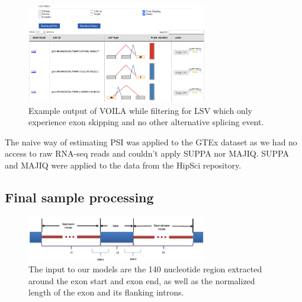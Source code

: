 \begin{figure}
	\centering\includegraphics[width=0.7\textwidth]{../visualizations/voila_example.png} 
	\caption[Four-chamber illustration of the human heart.]{Example output of VOILA while filtering for LSV which only experience exon skipping and no other alternative splicing event. }
	\label{fig:voilaexample}
\end{figure}


The naive way of estimating PSI was applied to the GTEx dataset as we had no access to raw RNA-seq reads and couldn't apply SUPPA nor MAJIQ. SUPPA and MAJIQ were applied to the data from the HipSci repository.
\subsection{Final sample processing} \cite{subsec:finalsampleprocessing}

\begin{figure}
	\centering\includegraphics[width=0.7\textwidth]{../visualizations/input_schematic.png} 
	\caption[bla.]{The input to our models are the 140 nucleotide region extracted around the exon start and exon end, as well as the normalized length of the exon and its flanking introns. }
	\label{fig:inputschematic}
\end{figure}

